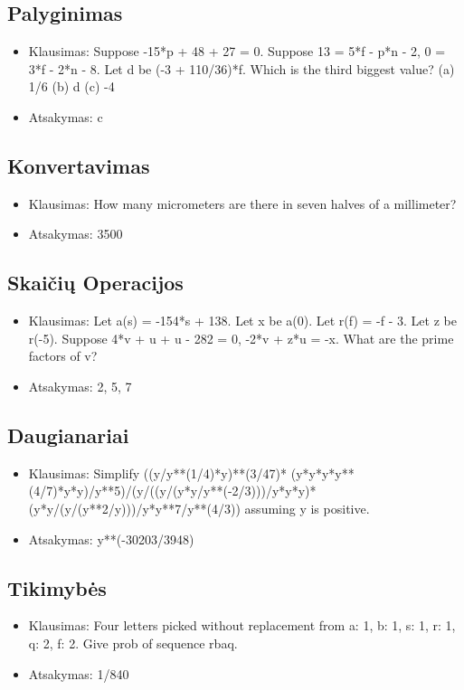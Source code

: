 \documentclass[conference]{IEEEtran}
\begin{document}
\subsection{Palyginimas}
\begin{itemize}
    \item Klausimas: Suppose -15*p + 48 + 27 = 0. Suppose 13 = 5*f - p*n - 2, 0 = 3*f - 2*n - 8. Let d be (-3 + 110/36)*f. Which is the third biggest value?  (a) 1/6  (b) d  (c) -4
    \item Atsakymas: c
\end{itemize}
\subsection{Konvertavimas}
\begin{itemize}
    \item Klausimas: How many micrometers are there in seven halves of a millimeter?
    \item Atsakymas: 3500
\end{itemize}
\subsection{Skaičių Operacijos}
\begin{itemize}
    \item Klausimas: Let a(s) = -154*s + 138. Let x be a(0). Let r(f) = -f - 3. Let z be r(-5). Suppose 4*v + u + u - 282 = 0, -2*v + z*u = -x. What are the prime factors of v?
    \item Atsakymas: 2, 5, 7
\end{itemize}
\subsection{Daugianariai}
\begin{itemize}
    \item Klausimas: Simplify ((y/y**(1/4)*y)**(3/47)*
    (y*y*y*y**(4/7)*y*y)/y**5)/(y/((y/(y*y/y**(-2/3)))/y*y*y)*
    (y*y/(y/(y**2/y)))/y*y**7/y**(4/3)) assuming y is positive.
    \item Atsakymas: y**(-30203/3948)
\end{itemize}
\subsection{Tikimybės}
\begin{itemize}
    \item Klausimas: Four letters picked without replacement from {a: 1, b: 1, s: 1, r: 1, q: 2, f: 2}. Give prob of sequence rbaq.
    \item Atsakymas: 1/840
\end{itemize}
\end{document}
